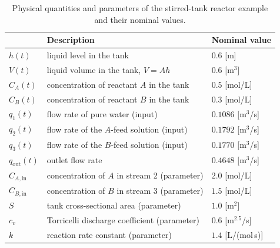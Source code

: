 \documentclass[11pt, a4paper]{article}
\renewcommand{\arraystretch}{1.3}
\theoremstyle{remark}
\theoremstyle{plain}
\begin{document}
\begin{table}
\renewcommand{\arraystretch}{1.} %
\begin{center}
{\small
\begin{tabular}{@{}lll@{}}
 & Description & Nominal value \\
\hline
$h(t)$ & liquid level in the tank & $0.6$ [m] \\
$V(t)$ & liquid volume in the tank, $V = A h$ & $0.6$ [m$^3$] \\
$C_A(t)$ & concentration of reactant $A$ in the tank & $0.5$ [mol/L] \\
$C_B(t)$ & concentration of reactant $B$ in the tank & $0.3$ [mol/L] \\
$q_1(t)$ & flow rate of pure water (input) & $0.1086$ [m$^3$/s] \\
$q_2(t)$ & flow rate of the $A$-feed solution (input) & $0.1792$ [m$^3$/s] \\
$q_3(t)$ & flow rate of the $B$-feed solution (input) & $0.1770$ [m$^3$/s] \\
$q_{\mathrm{out}}(t)$ & outlet flow rate & $0.4648$ [m$^3$/s] \\
$C_{A,\mathrm{in}}$ & concentration of $A$ in stream 2 (parameter) & $2.0$ [mol/L] \\
$C_{B,\mathrm{in}}$ & concentration of $B$ in stream 3 (parameter) & $1.5$ [mol/L] \\
$S$ & tank cross-sectional area (parameter) & $1.0$ [m$^2$] \\
$c_v$ & Torricelli discharge coefficient (parameter) & $0.6$ [m$^{2.5}$/s] \\
$k$ & reaction rate constant (parameter) & $1.4$ [L/(mol\,s)] \\
\hline
\end{tabular}
}
\end{center}
\caption{Physical quantities and parameters of the stirred-tank reactor example and their nominal values.}
\label{tab:cstr-parameters}
\end{table}
\end{document}
